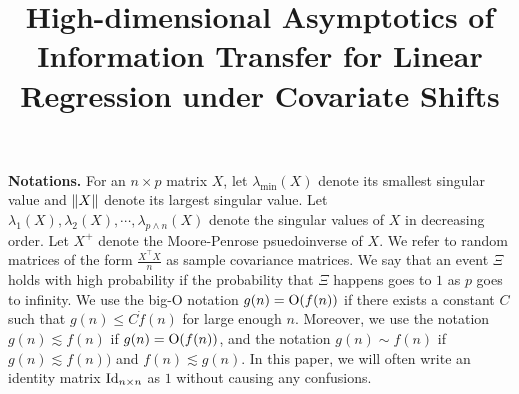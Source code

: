 \documentclass[aos,preprint]{imsart}
\begin{document}
\begin{frontmatter}

\title{High-dimensional Asymptotics of Information Transfer for Linear Regression under Covariate Shifts}


\begin{aug}
\author[A]{ \ead[label=e1]{}},
\author[B]{ \ead[label=e2]{}},
\author[C]{ \ead[label=e3]{}},\\
\author[A]{ \ead[label=e4]{} },
\and
\author[C]{\fnms{Christopher} \snm{R\'e}\ead[label=e5]{}}
\address{${ }^{1}$University of Pennsylvania, ${ }^{2}$Northeastern University, ${ }^{3}$Stanford University
}

\end{aug}



\medskip
\noindent\textbf{Notations.}
For an $n\times p$ matrix $X$, let $\lambda_{\min}(X)$ denote its smallest singular value and $\|X\|$ denote its largest singular value.
Let $\lambda_1(X), \lambda_2(X), \cdots, \lambda_{p\wedge n}(X)$ denote the singular values of $X$ in decreasing order.
Let $X^+$ denote the Moore-Penrose psuedoinverse of $X$.
We refer to random matrices of the form $\frac {X^\top X} n$ as sample covariance matrices.
We say that an event $\Xi$ holds with high probability if the probability that $\Xi$ happens goes to $1$ as $p$ goes to infinity.
We use the big-O notation $g(n) = \operatorname{O}(f(n))$ if there exists a constant $C$ such that $g(n) \le C \dot f(n)$ for large enough $n$. Moreover, we use the notation $g(n)\lesssim f(n)$ if $g(n) = \operatorname{O}(f(n))$, and the notation $g(n)\sim f(n)$ if $g(n) \lesssim f(n))$ and $f(n) \lesssim g(n)$. In this paper, we will often write an identity matrix $\operatorname{Id}_{n\times n}$ as $1$ without causing any confusions. 



\end{frontmatter}
\end{document}
